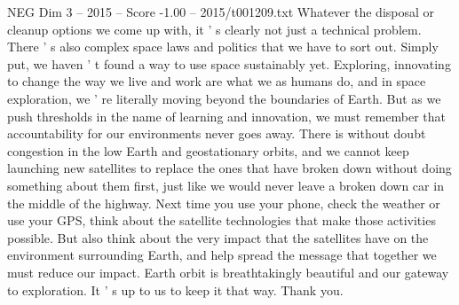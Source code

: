 \begin{textsample}{NEG Dim 3 – 2015 – Score -1.00 – 2015/t001209.txt}
Whatever the disposal or cleanup options we come up with, it ' s clearly not just a technical problem.
There ' s also complex space laws and politics that we have to sort out.
Simply put, we haven ' t found a way to use space sustainably yet.
Exploring, innovating to change the way we live and work are what we as humans do, and in space exploration, we ' re literally moving beyond the boundaries of Earth.
But as we push thresholds in the name of learning and innovation, we must remember that accountability for our environments never goes away.
There is without doubt congestion in the low Earth and geostationary orbits, and we cannot keep launching new satellites to replace the ones that have broken down without doing something about them first, just like we would never leave a broken down car in the middle of the highway.
Next time you use your phone, check the weather or use your GPS, think about the satellite technologies that make those activities possible.
But also think about the very impact that the satellites have on the environment surrounding Earth, and help spread the message that together we must reduce our impact.
Earth orbit is breathtakingly beautiful and our gateway to exploration.
It ' s up to us to keep it that way.
Thank you.

\end{textsample}
